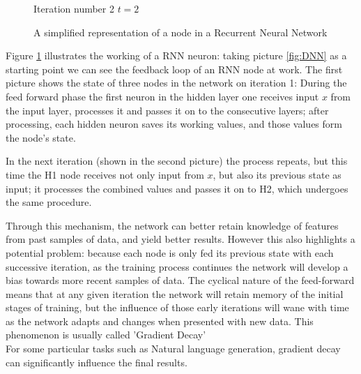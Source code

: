 \begin{figure}[H]
\centering    
{}
\begin{center}
Iteration number 2 $t=2$
\end{center}
    \caption{A simplified representation of a node in a Recurrent Neural Network}\label{fig:rnn_neuron}
    
\end{figure}
Figure \ref{fig:rnn_neuron} illustrates the working of a RNN neuron: taking picture \ref{fig:DNN} as a starting point we can see the feedback loop of an RNN node at work.
The first picture shows the state of three nodes in the network on iteration 1: During the feed forward phase the first neuron in the hidden layer one receives input $x$ from the input layer, processes it and passes it on to the consecutive layers; after processing, each hidden neuron saves its working values, and those values form the node's state.  

In the next iteration (shown in the second picture) the process repeats, but this time the  H1 node receives not only input from $x$, but also its previous state as input; it processes the combined values and passes it on to H2, which undergoes the same procedure.

Through this mechanism, the network can better retain knowledge of features from past samples of data, and yield better results.
However this also highlights a potential problem: because each node is only fed its previous state with each successive iteration, as the training process continues the network will develop a bias towards more recent samples of data.
 The cyclical nature of the feed-forward means that at any given iteration the network will retain memory of the initial stages of training, but the influence of those early iterations will wane with time as the network adapts and changes when presented with new data. This phenomenon is usually called 'Gradient Decay'\\
For some particular tasks such as Natural language generation, gradient decay can significantly influence the final results.

